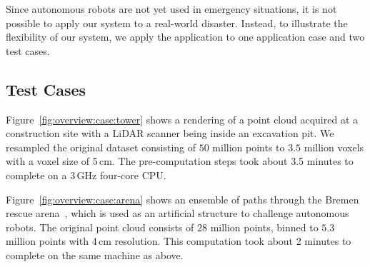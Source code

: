 \documentclass[conference,10pt,letter]{IEEEtran}
\begin{document}
Since autonomous robots are not yet used in emergency situations, it is not possible to apply our system to a real-world disaster. Instead, to illustrate the flexibility of our system, we apply the application to one application case and two test cases.

\subsection{Test Cases} \label{sec:results:testcases}
 Figure~\ref{fig:overview:case:tower} shows a rendering of a point cloud acquired at a construction site with a LiDAR scanner being inside an excavation pit. We resampled the original dataset consisting of $50$ million points to $3.5$ million voxels with a voxel size of 5\,cm. The pre-computation steps took about 3.5 minutes to complete on a 3\,GHz four-core CPU.

 Figure~\ref{fig:overview:case:arena} shows an ensemble of paths through the Bremen rescue arena~\cite{varsadan08}, which is used as an artificial structure to challenge autonomous robots. The original point cloud consists of $28$ million points, binned to $5.3$ million points with 4\,cm resolution. This computation took about 2 minutes to complete on the same machine as above.
\end{document}
